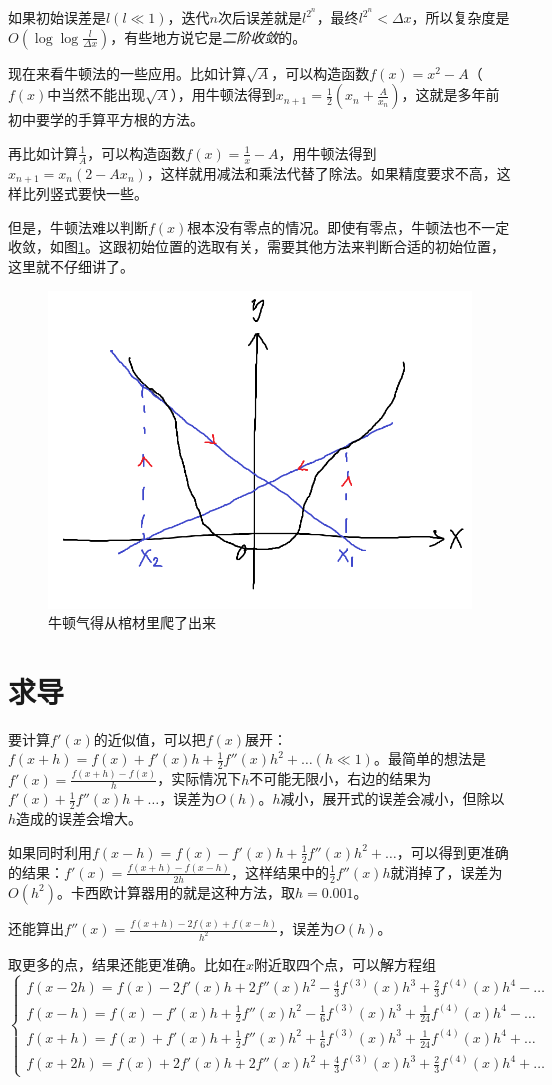 如果初始误差是$l(l \ll 1)$，迭代$n$次后误差就是$l^{2^n}$，最终$l^{2^n}<\Delta x$，所以复杂度是$O(\log \log \frac{l}{\Delta x})$，有些地方说它是\emph{二阶收敛}的。

现在来看牛顿法的一些应用。比如计算$\sqrt{A}$，可以构造函数$f(x)=x^2-A$（$f(x)$中当然不能出现$\sqrt{A}$），用牛顿法得到$x_{n+1}=\frac{1}{2}(x_n+\frac{A}{x_n})$，这就是多年前初中要学的手算平方根的方法。

再比如计算$\frac{1}{A}$，可以构造函数$f(x)=\frac{1}{x}-A$，用牛顿法得到$x_{n+1}=x_n(2-A x_n)$，这样就用减法和乘法代替了除法。如果精度要求不高，这样比列竖式要快一些。

但是，牛顿法难以判断$f(x)$根本没有零点的情况。即使有零点，牛顿法也不一定收敛，如图\ref{fig-newton-iter-boom}。这跟初始位置的选取有关，需要其他方法来判断合适的初始位置，这里就不仔细讲了。
\begin{figure}[htb]
\centering
\includegraphics[width=0.33\linewidth]{fig/newton-iter-boom.png}
\caption{牛顿气得从棺材里爬了出来}
\label{fig-newton-iter-boom}
\end{figure}
\section{求导}
要计算$f'(x)$的近似值，可以把$f(x)$展开：$f(x+h)=f(x)+f'(x) h+\frac{1}{2} f''(x) h^2+\dots(h \ll 1)$。最简单的想法是$f'(x)=\frac{f(x+h)-f(x)}{h}$，实际情况下$h$不可能无限小，右边的结果为$f'(x)+\frac{1}{2} f''(x) h+\dots$，误差为$O(h)$。$h$减小，展开式的误差会减小，但除以$h$造成的误差会增大。

如果同时利用$f(x-h)=f(x)-f'(x) h+\frac{1}{2} f''(x) h^2+\dots$，可以得到更准确的结果：$f'(x)=\frac{f(x+h)-f(x-h)}{2 h}$，这样结果中的$\frac{1}{2} f''(x) h$就消掉了，误差为$O(h^2)$。卡西欧计算器用的就是这种方法，取$h=0.001$。

还能算出$f''(x)=\frac{f(x+h)-2 f(x)+f(x-h)}{h^2}$，误差为$O(h)$。

取更多的点，结果还能更准确。比如在$x$附近取四个点，可以解方程组
\begin{equation*}
\begin{cases}
f(x-2 h)=f(x)-2 f'(x) h+2 f''(x) h^2-\frac{4}{3} f^{(3)}(x) h^3+\frac{2}{3} f^{(4)}(x) h^4-\dots \\
f(x-h)=f(x)-f'(x) h+\frac{1}{2} f''(x) h^2-\frac{1}{6} f^{(3)}(x) h^3+\frac{1}{24} f^{(4)}(x) h^4-\dots \\
f(x+h)=f(x)+f'(x) h+\frac{1}{2} f''(x) h^2+\frac{1}{6} f^{(3)}(x) h^3+\frac{1}{24} f^{(4)}(x) h^4+\dots \\
f(x+2 h)=f(x)+2 f'(x) h+2 f''(x) h^2+\frac{4}{3} f^{(3)}(x) h^3+\frac{2}{3} f^{(4)}(x) h^4+\dots
\end{cases}
\end{equation*}

